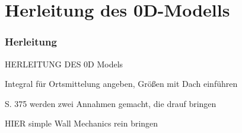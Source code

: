 \section{Herleitung des 0D-Modells}



\begin{frame}\frametitle{Herleitung}

  HERLEITUNG DES 0D Models

  Integral für Ortsmittelung angeben, Größen mit Dach einführen

  S. 375 werden zwei Annahmen gemacht, die drauf bringen

  HIER simple Wall Mechanics rein bringen

\end{frame}

